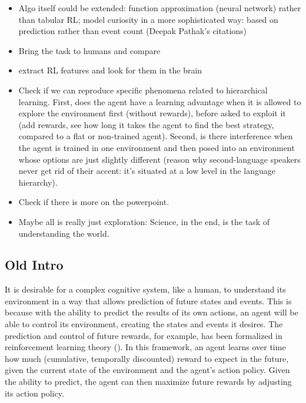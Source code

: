 \documentclass{article}
\begin{document}
\begin{itemize}
	\item Algo itself could be extended: function approximation (neural network) rather than tabular RL; model curiosity in a more sophisticated way: based on prediction rather than event count (Deepak Pathak's citations)
	\item Bring the task to humans and compare
	\item extract RL features and look for them in the brain
	\item Check if we can reproduce specific phenomena related to hierarchical learning. First, does the agent have a learning advantage when it is allowed to explore the environment first (without rewards), before asked to exploit it (add rewards, see how long it takes the agent to find the best strategy, compared to a flat or non-trained agent). Second, is there interference when the agent is trained in one environment and then posed into an environment whose options are just slightly different (reason why second-language speakers never get rid of their accent: it's situated at a low level in the language hierarchy).
	\item Check if there is more on the powerpoint.
	\item Maybe all is really just exploration: Science, in the end, is the task of understanding the world.
\end{itemize}

\subsection{Old Intro}

It is desirable for a complex cognitive system, like a human, to understand its environment in a way that allows prediction of future states and events. This is because with the ability to predict the results of its own actions, an agent will be able to control its environment, creating the states and events it desires. The prediction and control of future rewards, for example, has been formalized in reinforcement learning theory (\cite{sutton_reinforcement_2017}). In this framework, an agent learns over time how much (cumulative, temporally discounted) reward to expect in the future, given the current state of the environment and the agent's action policy. Given the ability to predict, the agent can then maximize future rewards by adjusting its action policy.
\end{document}
